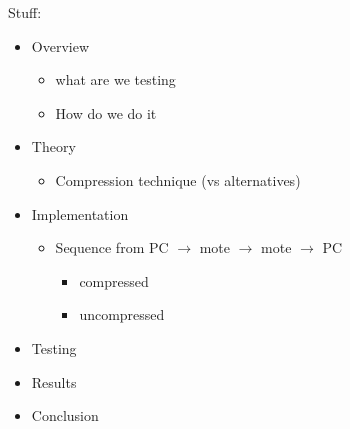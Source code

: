 Stuff:

\begin{itemize}
\item Overview
  \begin{itemize}
  \item what are we testing
  \item How do we do it
  \end{itemize}
\item Theory
  \begin{itemize}
  \item Compression technique (vs alternatives) 
  \end{itemize}

\item Implementation
\begin{itemize}
\item Sequence from PC $\rightarrow$ mote $\rightarrow$ mote $\rightarrow$ PC
  \begin{itemize}
  \item compressed
  \item uncompressed
  \end{itemize}
\end{itemize}


\item Testing
\item Results
\item Conclusion
\end{itemize}